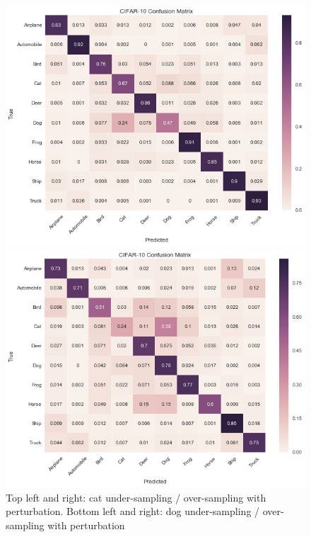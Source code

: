 \documentclass[runningheads,a4paper]{llncs}
\begin{document}
\begin{figure}
\begin{minipage}[b]{0.4\linewidth}
		\includegraphics[width=1\linewidth]{dog_undersampling_per.png} 
	\end{minipage}%
	\begin{minipage}[b]{0.4\linewidth}
		\centering
		\includegraphics[width=1\linewidth]{dog_oversampling_per.png} 
	\end{minipage} 
	\centering
	\caption{Top left and right: cat under-sampling / over-sampling with perturbation. Bottom left and right: dog under-sampling / over-sampling with perturbation}
	\label{fig:overlap}
\end{figure}
\end{document}
